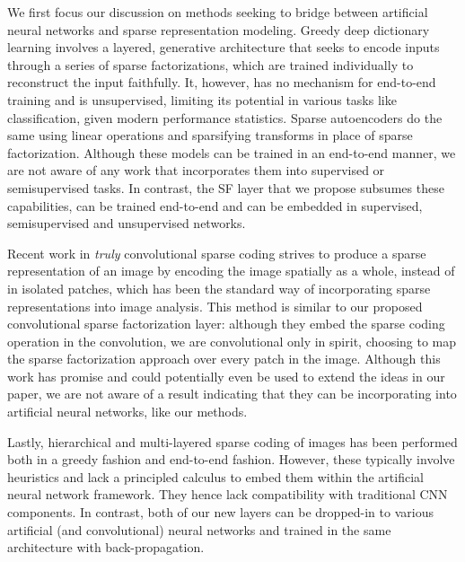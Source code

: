 \documentclass[10pt,twocolumn,letterpaper]{article}
\begin{document}
We first focus our discussion on methods seeking to bridge between artificial 
neural networks and sparse representation modeling.
Greedy deep dictionary learning \cite{TaMaSiarXiv2016} involves a layered, 
generative architecture that seeks to encode inputs through a series of sparse 
factorizations, which are trained individually to reconstruct the input 
faithfully.  It, however, has no mechanism for end-to-end training and is 
unsupervised, limiting its potential in various tasks like classification, 
given modern performance statistics.  Sparse autoencoders 
\cite{MaFrarXiv2013,HiMomentum2010} do the same using linear operations and 
sparsifying transforms in place of sparse factorization.  Although these models 
can be trained in an end-to-end manner, we are not aware of any work that 
incorporates them into supervised or semisupervised tasks.  In contrast, the SF 
layer that we propose subsumes these capabilities, can be trained end-to-end 
and can be embedded in supervised, semisupervised and unsupervised networks.

Recent work in \textit{truly} convolutional sparse coding 
\cite{KaSeBoNIPS2010,BrErLuCVPR2013} strives to produce a sparse representation 
of an image by encoding the image spatially as a whole, instead of in isolated 
patches, which has been the standard way of incorporating sparse 
representations into image analysis.  This method is similar to our proposed 
convolutional sparse factorization layer: although they embed the sparse coding 
operation in the convolution, we are convolutional only in spirit, choosing to 
map the sparse factorization approach over every patch in the image.  Although 
this work has promise and could potentially even be used to extend the ideas in 
our paper, we are not aware of a result indicating that they can be incorporating 
into artificial 
neural networks, like our methods.

Lastly, hierarchical and multi-layered sparse coding of images \cite{YuLiLaCVPR2011,YaYuHuCVPR2010,BoReFoNIPS2011} has been performed both in a greedy fashion and end-to-end fashion.  However, these typically involve heuristics and lack a principled calculus to embed them within the artificial neural network framework.  They hence lack compatibility with traditional CNN components.  In contrast, both of our new layers can be dropped-in to various artificial (and convolutional) neural networks and trained in the same architecture with back-propagation.
\end{document}
